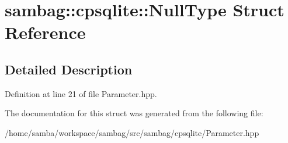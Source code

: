 \hypertarget{structsambag_1_1cpsqlite_1_1_null_type}{
\section{sambag::cpsqlite::NullType Struct Reference}
\label{structsambag_1_1cpsqlite_1_1_null_type}
}


\subsection{Detailed Description}


Definition at line 21 of file Parameter.hpp.



The documentation for this struct was generated from the following file:\begin{DoxyCompactItemize}
\item 
/home/samba/workspace/sambag/src/sambag/cpsqlite/Parameter.hpp\end{DoxyCompactItemize}
